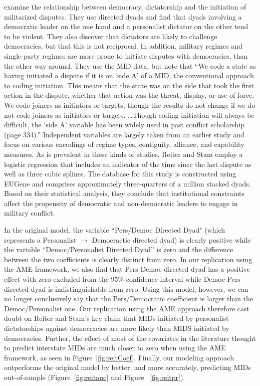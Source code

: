 \documentclass[12pt]{amsart}
\begin{document}
\citet{reiter:stam:2003} examine the relationship between democracy, dictatorship and the initiation of militarized disputes.  They use directed dyads and find that dyads involving a democratic leader on the one hand and a personalist dictator on the other tend to be violent. They also discover that dictators are likely to challenge democracies, but that this is not reciprocal.  In addition, military regimes and single-party regimes are more prone to initiate disputes with democracies, than the other way around.  They use the MID data, but note that ``We code a state as having initiated a dispute if it is on `side A' of a MID, the conventional approach to coding initiation. This means that the state was on the side that took the first action in the dispute, whether that action was the threat, display, or use of force. We code joiners as initiators or targets, though the results do not change if we do not code joiners as initiators or targets. \ldots Though coding initiation will always be difficult, the `side A' variable has been widely used in past conflict scholarship (page 334).'' Independent variables are largely taken from an earlier study and focus on various encodings of regime types, contiguity, alliance, and capability measures. As is prevalent in these kinds of studies, Reiter and Stam employ a logistic regression that includes an indicator of the time since the last dispute as well as three cubic splines. The database for this study is constructed using EUGene \citep{bennett:stam:2000} and comprises approximately three-quarters of a million stacked dyads. Based on their statistical analysis, they conclude that institutional constraints affect the propensity of democratic and non-democratic leaders to engage in military conflict. 

In the original model, the variable ``Pers/Democ Directed Dyad" (which represents a Personalist $\rightarrow$ Democractic directed dyad) is clearly positive while the variable ``Democ/Personalist Directed Dyad'' is zero and the difference between the two coefficients is clearly distinct from zero. In our replication using the AME framework, we also find that Pers-Democ directed dyad has a positive effect with zero excluded from the 95\% confidence interval while Democ-Pers directed dyad is indistinguishable from zero. Using this model, however, we can no longer conclusively say that the Pers/Democratic coefficient is larger than the Democ/Personalist one.
Our replication using the AME approach therefore cast doubt on Reiter and Stam's key claim that MIDs initiated by personalist dictatorships against democracies are more likely than MIDS initiated by democracies. Further, the effect of most of the covariates in the literature thought to predict interstate MIDs are much closer to zero when using the AME framework, as seen in Figure~\ref{fig:reitCoef}. Finally, our modeling approach outperforms the original model by better, and more accurately, predicting MIDs out-of-sample (Figure~\ref{fig:reitauc} and Figure ~\ref{fig:reitpr}).  
\end{document}
